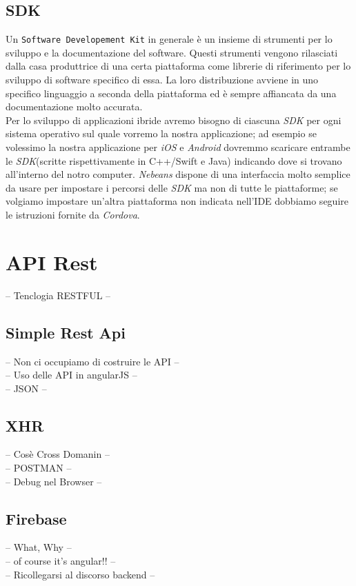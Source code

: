 \subsection{SDK}
Un \texttt{Software Developement Kit} in generale è un insieme di strumenti per lo sviluppo e la documentazione del software\citeauthor{wiki:sdk}. Questi strumenti vengono rilasciati dalla casa produttrice di una certa piattaforma come librerie di riferimento per lo sviluppo di software specifico di essa. La loro distribuzione avviene in uno specifico linguaggio a seconda della piattaforma ed è sempre affiancata da una documentazione molto accurata.\\
Per lo sviluppo di applicazioni ibride avremo bisogno di ciascuna \emph{SDK} per ogni sistema operativo sul quale vorremo la nostra applicazione; ad esempio se volessimo la nostra applicazione per \emph{iOS} e \emph{Android} dovremmo scaricare entrambe le \emph{SDK}(scritte rispettivamente in C++/Swift e Java) indicando dove si trovano all'interno del notro computer. \emph{Nebeans} dispone di una interfaccia molto semplice da usare per impostare i percorsi delle \emph{SDK} ma non di tutte le piattaforme; se volgiamo impostare un'altra piattaforma non indicata nell'IDE dobbiamo seguire le istruzioni fornite da \emph{Cordova}.
\section{API Rest}
-- Tenclogia RESTFUL --\\
\subsection{Simple Rest Api}
-- Non ci occupiamo di costruire le API --\\
-- Uso delle API in angularJS --\\
-- JSON --\\
\subsection{XHR}
-- Cosè Cross Domanin --\\
-- POSTMAN --\\
-- Debug nel Browser --\\
\subsection{Firebase}
-- What, Why --\\
-- of course it's angular!! --\\
-- Ricollegarsi al discorso backend --